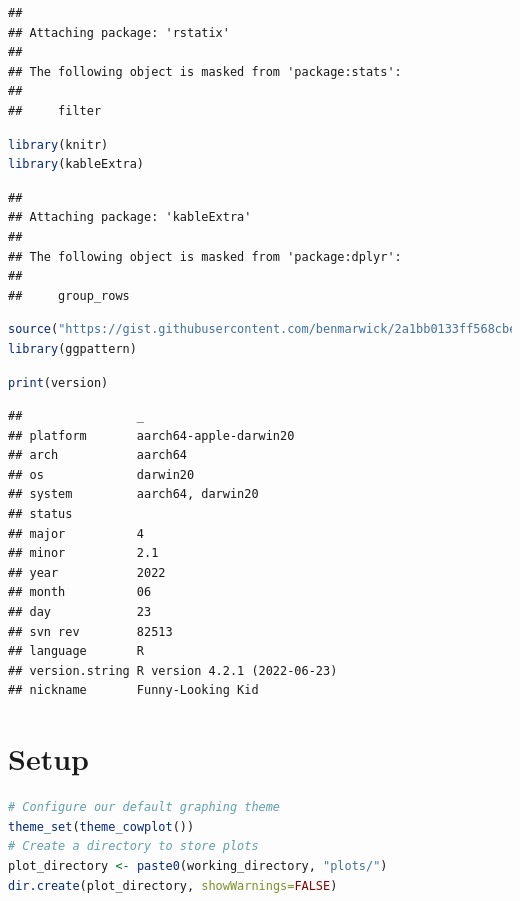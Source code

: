 \documentclass[
]{book}
\begin{document}
\begin{lstlisting}
## 
## Attaching package: 'rstatix'
## 
## The following object is masked from 'package:stats':
## 
##     filter
\end{lstlisting}

\begin{lstlisting}[language=R]
library(knitr)
library(kableExtra)
\end{lstlisting}

\begin{lstlisting}
## 
## Attaching package: 'kableExtra'
## 
## The following object is masked from 'package:dplyr':
## 
##     group_rows
\end{lstlisting}

\begin{lstlisting}[language=R]
source("https://gist.githubusercontent.com/benmarwick/2a1bb0133ff568cbe28d/raw/fb53bd97121f7f9ce947837ef1a4c65a73bffb3f/geom_flat_violin.R")
library(ggpattern)
\end{lstlisting}

\begin{lstlisting}[language=R]
print(version)
\end{lstlisting}

\begin{lstlisting}
##                _                           
## platform       aarch64-apple-darwin20      
## arch           aarch64                     
## os             darwin20                    
## system         aarch64, darwin20           
## status                                     
## major          4                           
## minor          2.1                         
## year           2022                        
## month          06                          
## day            23                          
## svn rev        82513                       
## language       R                           
## version.string R version 4.2.1 (2022-06-23)
## nickname       Funny-Looking Kid
\end{lstlisting}

\hypertarget{setup}{%
\section{Setup}\label{setup}}

\begin{lstlisting}[language=R]
# Configure our default graphing theme
theme_set(theme_cowplot())
# Create a directory to store plots
plot_directory <- paste0(working_directory, "plots/")
dir.create(plot_directory, showWarnings=FALSE)
\end{lstlisting}
\end{document}
